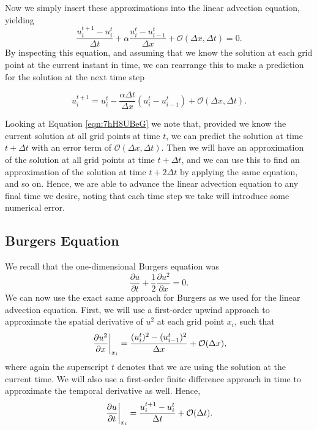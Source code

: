 Now we simply insert these approximations into the linear advection equation, yielding
\begin{equation}
	\frac{u_i^{t+1} - u_{i}^t}{\Delta t} +  \alpha \frac{u_i^t - u_{i-1}^t}{\Delta x} + \mathcal{O}(\Delta x, \Delta t) = 0.
\end{equation}
By inspecting this equation, and assuming that we know the solution at each grid point at the current instant in time, we can rearrange this to make a prediction for the solution at the next time step
\begin{eqBox}
\begin{equation}
	u_i^{t+1} = u_{i}^t -\frac{\alpha \Delta t}{\Delta x} \left( u_i^t - u_{i-1}^t \right) + \mathcal{O}(\Delta x, \Delta t).
	\label{eqn:7hH8UBeG}
\end{equation}
\end{eqBox}

Looking at Equation \ref{eqn:7hH8UBeG} we note that, provided we know the current solution at all grid points at time $t$, we can predict the solution at time $t+\Delta t$ with an error term of $\mathcal{O}(\Delta x, \Delta t)$. Then we will have an approximation of the solution at all grid points at time $t+\Delta t$, and we can use this to find an approximation of the solution at time $t+2\Delta t$ by applying the same equation, and so on. Hence, we are able to advance the linear advection equation to any final time we desire, noting that each time step we take will introduce some numerical error.

\subsection{Burgers Equation}
We recall that the one-dimensional Burgers equation was
\begin{equation}
	\frac{\partial u}{\partial t} +  \frac{1}{2} \frac{\partial u^2}{\partial x} = 0.
\end{equation}
We can now use the exact same approach for Burgers as we used for the linear advection equation. First, we will use a first-order upwind approach to approximate the spatial derivative of $u^2$ at each grid point $x_i$, such that
\begin{equation}
	\left.\frac{\partial u^2}{\partial x}\right\rvert_{x_i}^{} = \frac{(u_i^t)^2 - (u_{i-1}^t)^2}{\Delta x} + \mathcal{O}(\Delta x),
\end{equation}
where again the superscript $t$ denotes that we are using the solution at the current time. We will also use a first-order finite difference approach in time to approximate the temporal derivative as well. Hence,
\begin{equation}
	\left.\frac{\partial u}{\partial t}\right\rvert_{x_i}^{} = \frac{u_i^{t+1} - u_{i}^t}{\Delta t} + \mathcal{O}(\Delta t).
\end{equation}

